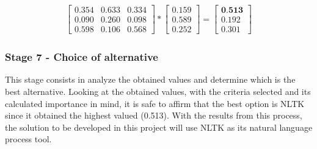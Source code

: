 \begin{gather}
    \begin{bmatrix}
        0.354 & 0.633 & 0.334 \\
        0.090 & 0.260 & 0.098 \\
        0.598 & 0.106 & 0.568
    \end{bmatrix}
    *
    \begin{bmatrix}
      0.159 \\
      0.589 \\
      0.252
    \end{bmatrix}
      =
    \begin{bmatrix}
      \textbf{0.513} \\
      0.192 \\
      0.301
    \end{bmatrix}
\end{gather}

\subsubsection{Stage 7 - Choice of alternative}

This stage consists in analyze the obtained values and determine which is the best alternative.
Looking at the obtained values, with the criteria selected and its calculated importance in mind, it is safe to affirm that the best option is NLTK since it obtained the highest valued (0.513).
With the results from this process, the solution to be developed in this project will use NLTK as its natural language process tool.
